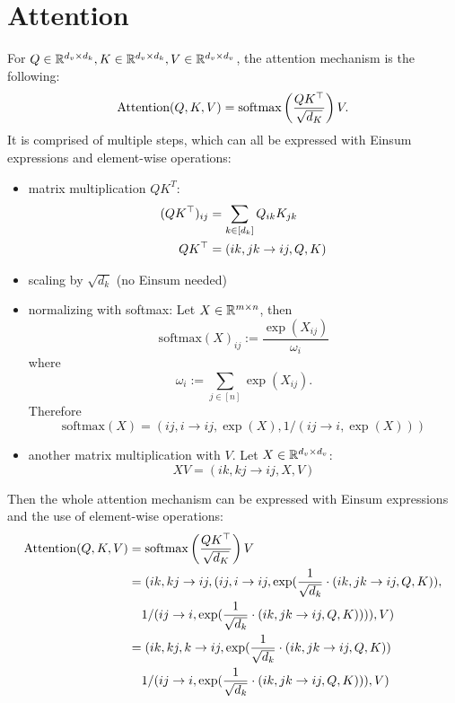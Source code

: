\section{Attention}
For $Q \in \mathbb{R}^{d_v \times d_k}, K \in \mathbb{R}^{d_v \times d_k}, V \in \mathbb{R}^{d_v \times d_v}$, the attention mechanism is the following:
$$\text{Attention}(Q,K,V) = \text{softmax}\left(\frac{Q K^\top}{\sqrt{d_K}}\right)V.$$
It is comprised of multiple steps, which can all be expressed with Einsum expressions and element-wise operations:
\begin{itemize}
    \item matrix multiplication $Q K^T$:
          \begin{align*}
              (QK^\top)_{ij} & = \sum\limits_{k \in [d_k]} Q_{ik} K_{jk} \\
              QK^\top        & = (ik, jk \rightarrow ij, Q, K)
          \end{align*}
    \item scaling by $\sqrt{d_k}$ (no Einsum needed)
    \item normalizing with softmax: Let $X \in \mathbb{R}^{m \times n}$, then
          $$\text{softmax}(X)_{ij} := \frac{\exp(X_{ij})}{\omega_i}$$
          where
          $$\omega_i := \sum\limits_{j \in [n]} \exp(X_{ij}).$$
          Therefore
          $$\text{softmax}(X) = (ij, i \rightarrow ij, \exp(X), 1 / (ij \rightarrow i, \exp(X)))$$
    \item another matrix multiplication with $V$. Let $X \in \mathbb{R}^{d_v \times d_v}$:
          $$X V = (ik, kj \rightarrow ij, X, V)$$
\end{itemize}

Then the whole attention mechanism can be expressed with Einsum expressions and the use of element-wise operations:
\begin{align*}
    \text{Attention}(Q, K, V) & = \text{softmax}\left(\frac{Q K^\T}{\sqrt{d_K}}\right)V                                                          \\
                              & = (ik, kj \rightarrow ij, (ij, i \rightarrow ij, \exp(\frac{1}{\sqrt{d_k}} \cdot (ik, jk \rightarrow ij, Q, K)), \\
                              & \phantom{{}=} 1 / (ij \rightarrow i, \exp(\frac{1}{\sqrt{d_k}} \cdot (ik, jk \rightarrow ij, Q, K)))), V)        \\
                              & = (ik, kj, k \rightarrow ij, \exp(\frac{1}{\sqrt{d_k}} \cdot (ik, jk \rightarrow ij, Q, K))                      \\
                              & \phantom{{}=} 1 / (ij \rightarrow i, \exp(\frac{1}{\sqrt{d_k}} \cdot (ik, jk \rightarrow ij, Q, K))), V)
\end{align*}
